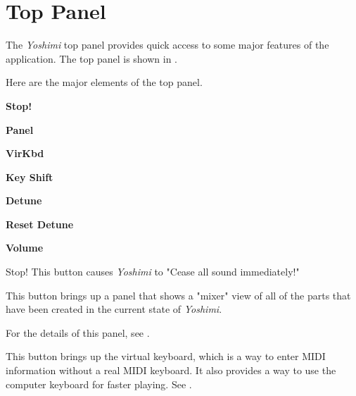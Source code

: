 %
%
%

\section{Top Panel}
\label{sec:top_panel}

   The \textsl{Yoshimi} top panel provides quick access to some major
   features of the application.
   The top panel is shown in
   .

   Here are the major elements of the top panel.

   \begin{enumber}
      \item \textbf{Stop!}
      \item \textbf{Panel}
      \item \textbf{VirKbd}
      \item \textbf{Key Shift}
      \item \textbf{Detune}
      \item \textbf{Reset Detune}
      \item \textbf{Volume}
   \end{enumber}

   \setcounter{ItemCounter}{0}      %

   Stop!
   This button causes \textsl{Yoshimi} to
   "Cease all sound immediately!"

   This button brings up a panel that shows a "mixer" view
   of all of the parts that have been created in the current
   state of \textsl{Yoshimi}.

   For the details of this panel,
   see .

   This button brings up the virtual keyboard, which is a way to enter
   MIDI information without a real MIDI keyboard. 
   It also provides a way to use the computer keyboard for faster
   playing.  See .

